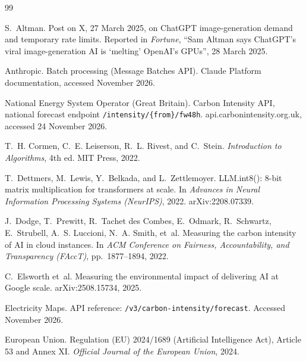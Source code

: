 \documentclass[11pt]{article}
\theoremstyle{definition}
\theoremstyle{remark}
\begin{document}
\begin{thebibliography}{99}\small

S.~Altman.
\newblock Post on X, 27 March 2025, on ChatGPT image-generation demand and temporary rate limits.
\newblock Reported in \emph{Fortune}, ``Sam Altman says ChatGPT's viral image-generation AI is `melting' OpenAI's GPUs'', 28 March 2025.

Anthropic.
\newblock Batch processing (Message Batches API).
\newblock Claude Platform documentation, accessed November 2026.

National Energy System Operator (Great Britain).
\newblock Carbon Intensity API, national forecast endpoint \texttt{/intensity/\{from\}/fw48h}.
\newblock api.carbonintensity.org.uk, accessed 24 November 2026.

T.~H. Cormen, C.~E. Leiserson, R.~L. Rivest, and C.~Stein.
\newblock \emph{Introduction to Algorithms}, 4th ed.
\newblock MIT Press, 2022.

T.~Dettmers, M.~Lewis, Y.~Belkada, and L.~Zettlemoyer.
\newblock LLM.int8(): 8-bit matrix multiplication for transformers at scale.
\newblock In \emph{Advances in Neural Information Processing Systems (NeurIPS)}, 2022. arXiv:2208.07339.

J.~Dodge, T.~Prewitt, R.~Tachet des Combes, E.~Odmark, R.~Schwartz, E.~Strubell, A.~S. Luccioni, N.~A. Smith, et~al.
\newblock Measuring the carbon intensity of AI in cloud instances.
\newblock In \emph{ACM Conference on Fairness, Accountability, and Transparency (FAccT)}, pp.~1877--1894, 2022.

C.~Elsworth et~al.
\newblock Measuring the environmental impact of delivering AI at Google scale.
\newblock arXiv:2508.15734, 2025.

Electricity Maps.
\newblock API reference: \texttt{/v3/carbon-intensity/forecast}.
\newblock Accessed November 2026.

European Union.
\newblock Regulation (EU) 2024/1689 (Artificial Intelligence Act), Article 53 and Annex XI.
\newblock \emph{Official Journal of the European Union}, 2024.


\end{thebibliography}
\end{document}
